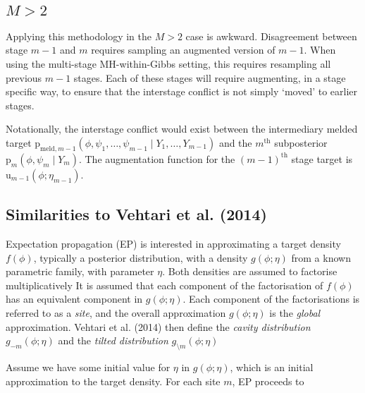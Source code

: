 \documentclass[10pt,a4paper,]{article}
\newcommand{\pd}{\text{p}}
\newcommand{\tarw}{\text{u}}
\newcommand{\Nm}{M}
\newcommand{\modelindex}{m}
\begin{document}
\subsection{\texorpdfstring{\(\Nm > 2\)}{\textbackslash{}Nm \textgreater{} 2}}\label{nm-2}

Applying this methodology in the \(\Nm > 2\) case is awkward.
Disagreement between stage \(\modelindex - 1\) and \(\modelindex\)
requires sampling an augmented version of \(\modelindex - 1\). When
using the multi-stage MH-within-Gibbs setting, this requires resampling
all previous \(\modelindex - 1\) stages. Each of these stages will
require augmenting, in a stage specific way, to ensure that the
interstage conflict is not simply `moved' to earlier stages.

Notationally, the interstage conflict would exist between the
intermediary melded target
\(\pd_{\text{meld}, \modelindex - 1}(\phi, \psi_{1}, \ldots, \psi_{\modelindex - 1}\mid Y_{1}, \ldots, Y_{\modelindex - 1})\)
and the \(m^{\text{th}}\) subposterior
\(\pd_{\modelindex}(\phi, \psi_{\modelindex} \mid Y_{\modelindex})\).
The augmentation function for the \((\modelindex - 1)^{\text{th}}\)
stage target is
\(\tarw_{\modelindex - 1}(\phi; \eta_{\modelindex - 1})\).

\subsection{Similarities to Vehtari et al.
(2014)}\label{similarities-to-vehtarietal14}

Expectation propagation (EP) is interested in approximating a target
density \(f(\phi)\), typically a posterior distribution, with a density
\(g(\phi; \eta)\) from a known parametric family, with parameter
\(\eta\). Both densities are assumed to factorise multiplicatively
 It
is assumed that each component of the factorisation of \(f(\phi)\) has
an equivalent component in \(g(\phi; \eta)\). Each component of the
factorisations is referred to as a \emph{site}, and the overall
approximation \(g(\phi; \eta)\) is the \emph{global} approximation.
Vehtari et al. (2014) then define the \emph{cavity distribution}
\(g_{-\modelindex}(\phi; \eta)\) and the \emph{tilted distribution}
\(g_{\setminus\modelindex}(\phi; \eta)\)


Assume we have some initial value for \(\eta\) in \(g(\phi; \eta)\),
which is an initial approximation to the target density. For each site
\(\modelindex\), EP proceeds to
\end{document}
